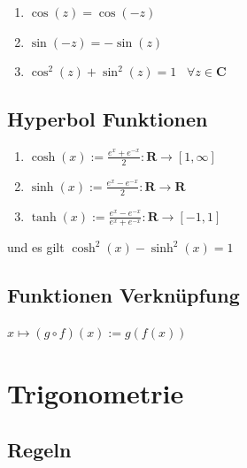 \documentclass[8pt]{extarticle}
\begin{document}
\begin{multicols*}{3}
\begin{center}
\end{center}

\begin{enumerate}
  \item $\cos(z) = \cos(-z)$
  \item $\sin(-z) = -\sin(z)$
  \item $\cos^2(z) + \sin^2(z) = 1 \;\;\; \forall z \in \mathbf{C}$
\end{enumerate}


\subsection{Hyperbol Funktionen}

\begin{enumerate}
  \item $\cosh(x) := \frac{e^x + e^{-x}}{2}: \mathbf{R} \rightarrow [1, \infty]$
  \item $\sinh(x) := \frac{e^x - e^{-x}}{2}: \mathbf{R} \rightarrow \mathbf{R}$
  \item $\tanh(x) := \frac{e^x - e^{-x}}{e^x + e^{-x}}: \mathbf{R} \rightarrow [-1, 1]$
\end{enumerate}
und es gilt $\cosh^2(x) - \sinh^2(x) = 1$



\subsection{Funktionen Verknüpfung}

$
x \mapsto (g \circ f)(x) := g(f(x))
$
%



\section{Trigonometrie}

\subsection{Regeln}

\end{multicols*}
\end{document}
